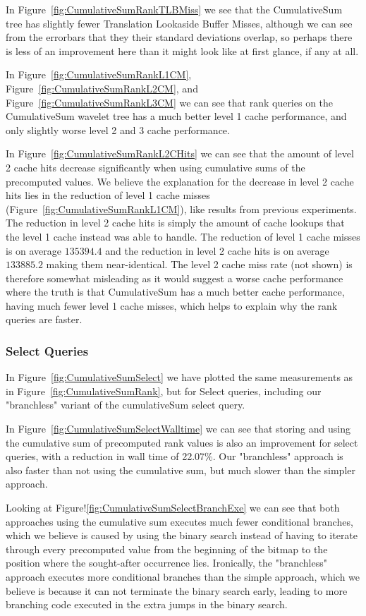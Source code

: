 In Figure~\ref{fig:CumulativeSumRankTLBMiss} we see that the CumulativeSum tree has slightly fewer Translation Lookaside Buffer Misses, although we can see from the errorbars that they their standard deviations overlap, so perhaps there is less of an improvement here than it might look like at first glance, if any at all.

In Figure~\ref{fig:CumulativeSumRankL1CM}, Figure~\ref{fig:CumulativeSumRankL2CM}, and Figure~\ref{fig:CumulativeSumRankL3CM} we can see that rank queries on the CumulativeSum wavelet tree has a much better level 1 cache performance, and only slightly worse level 2 and 3 cache performance.

In Figure~\ref{fig:CumulativeSumRankL2CHits} we can see that the amount of level 2 cache hits decrease significantly when using cumulative sums of the precomputed values.
We believe the explanation for the decrease in level 2 cache hits lies in the reduction of level 1 cache misses (Figure~\ref{fig:CumulativeSumRankL1CM}), like results from previous experiments.
The reduction in level 2 cache hits is simply the amount of cache lookups that the level 1 cache instead was able to handle.
The reduction of level 1 cache misses is on average $\num{135394.4}$ and the reduction in level 2 cache hits is on average $\num{133885.2}$ making them near-identical.
The level 2 cache miss rate (not shown) is therefore somewhat misleading as it would suggest a worse cache performance where the truth is that CumulativeSum has a much better cache performance, having much fewer level 1 cache misses, which helps to explain why the rank queries are faster.



\subsubsection{Select Queries}
\label{sec:cumulativeSumExperimentSelectQueries}
In Figure~\ref{fig:CumulativeSumSelect} we have plotted the same measurements as in Figure~\ref{fig:CumulativeSumRank}, but for Select queries, including our "branchless" variant of the cumulativeSum select query.

In Figure~\ref{fig:CumulativeSumSelectWalltime} we can see that storing and using the cumulative sum of precomputed rank values is also an improvement for select queries, with a reduction in wall time of 22.07\%.
Our "branchless" approach is also faster than not using the cumulative sum, but much slower than the simpler approach.

Looking at Figure!\ref{fig:CumulativeSumSelectBranchExe} we can see that both approaches using the cumulative sum executes much fewer conditional branches, which we believe is caused by using the binary search instead of having to iterate through every precomputed value from the beginning of the bitmap to the position where the sought-after occurrence lies.
Ironically, the "branchless" approach executes more conditional branches than the simple approach, which we believe is because it can not terminate the binary search early, leading to more branching code executed in the extra jumps in the binary search.

